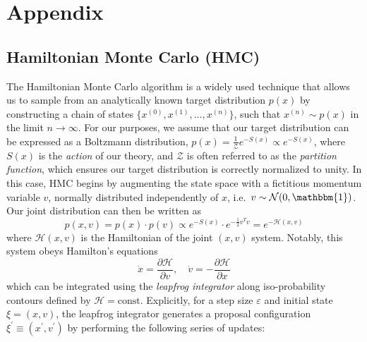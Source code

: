 \documentclass{article} %
\begin{document}



\appendix
\section{Appendix}
%
\subsection{\label{subsec:HMC}Hamiltonian Monte Carlo (HMC)}
%
The Hamiltonian Monte Carlo algorithm is a widely used technique that allows us to sample from an analytically known
target distribution \(p(x)\) by constructing a chain of states \(\{x^{(0)}, x^{(1)}, \ldots, x^{(n)}\}\), such that
\(x^{(n)}\sim p(x)\) in the limit \(n\rightarrow\infty\).
%
For our purposes, we assume that our target distribution can be expressed as a Boltzmann distribution, \(p(x) =
\tfrac{1}{\mathcal{Z}} e^{-S(x)}\propto e^{-S(x)}\), where \(S(x)\) is the \emph{action} of our theory, and
\(\mathcal{Z}\) is often referred to as the \emph{partition function}, which ensures our target distribution is
correctly normalized to unity.
%
In this case, HMC begins by augmenting the state space with a fictitious momentum variable \(v\), normally
distributed independently of \(x\), i.e.\ \(v\sim\mathcal{N}(0, \mathbbm{1})\).
%
Our joint distribution can then be written as
%
\begin{equation}
   p(x, v) = p(x)\cdot p(v) \propto e^{-S(x)}\cdot e^{-\frac{1}{2}v^{T}v} = e^{-\mathcal{H}(x, v)}
\end{equation}
%
where \(\mathcal{H}(x, v)\) is the Hamiltonian of the joint \((x, v)\) system.
%
Notably, this system obeys Hamilton's equations
%
\begin{equation}
   \dot{x} = \frac{\partial\mathcal{H}}{\partial v},\quad \dot{v} = -\frac{\partial\mathcal{H}}{\partial x}
\end{equation}
%
which can be integrated using the \emph{leapfrog integrator} along iso-probability contours defined by \(\mathcal{H} =
\text{const}\).
%
Explicitly, for a step size \(\varepsilon\) and initial state \(\xi = (x, v)\), the leapfrog integrator generates a
proposal configuration \(\xi^{\prime} \equiv (x^{\prime}, v^{\prime})\) by performing the following series of updates: 
%
\end{document}
